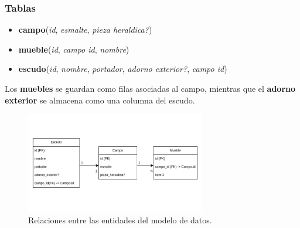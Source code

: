 \subsubsection{Tablas}
\begin{itemize}
    \item \textbf{campo}(\textit{id}, \textit{esmalte}, \textit{pieza heraldica?})
    \item \textbf{mueble}(\textit{id}, \textit{campo id}, \textit{nombre})
    \item \textbf{escudo}(\textit{id}, \textit{nombre}, \textit{portador}, \textit{adorno exterior?}, \textit{campo id})
\end{itemize}

Los \textbf{muebles} se guardan como filas asociadas al campo, mientras que el \textbf{adorno exterior} 
se almacena como una columna del escudo.

\begin{figure}[H]
    \centering
    \includegraphics[width=0.7\textwidth]{figuras/diagramaBD.jpg}
    \caption{Relaciones entre las entidades del modelo de datos.}
    \label{fig:diagrama-bd}
\end{figure}